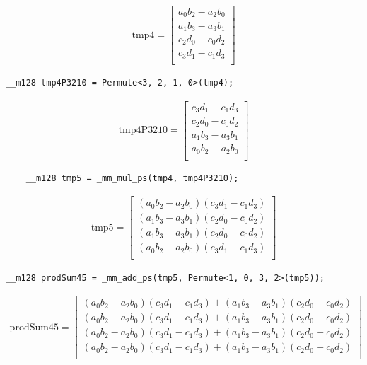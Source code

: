\documentclass[]{scrartcl}
\newcommand{\pth}[1]{\left(#1\right)}
\begin{document}
\begin{align*}
\mathrm{tmp4} 
=
\begin{bmatrix}
a_0b_2 - a_2b_0\\
a_1b_3 - a_3b_1\\
c_2d_0 - c_0d_2\\
c_3d_1 - c_1d_3\\
\end{bmatrix}
\end{align*}

\begin{verbatim}
__m128 tmp4P3210 = Permute<3, 2, 1, 0>(tmp4);
\end{verbatim}

\begin{align*}
\mathrm{tmp4P3210} 
=
\begin{bmatrix}
c_3d_1 - c_1d_3\\
c_2d_0 - c_0d_2\\
a_1b_3 - a_3b_1\\
a_0b_2 - a_2b_0\\
\end{bmatrix}
\end{align*}

\begin{verbatim}
    __m128 tmp5 = _mm_mul_ps(tmp4, tmp4P3210);
\end{verbatim}

\begin{align*}
\mathrm{tmp5} 
=
\begin{bmatrix}
\pth{a_0b_2 - a_2b_0}\pth{c_3d_1 - c_1d_3}\\
\pth{a_1b_3 - a_3b_1}\pth{c_2d_0 - c_0d_2}\\
\pth{a_1b_3 - a_3b_1}\pth{c_2d_0 - c_0d_2}\\
\pth{a_0b_2 - a_2b_0}\pth{c_3d_1 - c_1d_3}\\
\end{bmatrix}
\end{align*}


\begin{verbatim}
__m128 prodSum45 = _mm_add_ps(tmp5, Permute<1, 0, 3, 2>(tmp5));
\end{verbatim}



\begin{align*}
\mathrm{prodSum45} 
=
\begin{bmatrix}
  \pth{a_0b_2 - a_2b_0}\pth{c_3d_1 - c_1d_3}
+ \pth{a_1b_3 - a_3b_1}\pth{c_2d_0 - c_0d_2}\\
  \pth{a_0b_2 - a_2b_0}\pth{c_3d_1 - c_1d_3}
+ \pth{a_1b_3 - a_3b_1}\pth{c_2d_0 - c_0d_2}\\
  \pth{a_0b_2 - a_2b_0}\pth{c_3d_1 - c_1d_3}
+ \pth{a_1b_3 - a_3b_1}\pth{c_2d_0 - c_0d_2}\\
  \pth{a_0b_2 - a_2b_0}\pth{c_3d_1 - c_1d_3}
+ \pth{a_1b_3 - a_3b_1}\pth{c_2d_0 - c_0d_2}\\
\end{bmatrix}
\end{align*}
\end{document}
